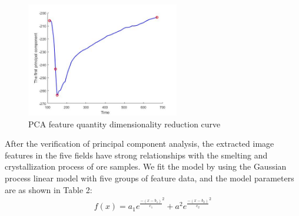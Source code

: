 \documentclass{apmcmthesis}
\begin{document}
		\begin{figure}[htbp!]
			\centering
			\includegraphics[height=5cm]{./figures/6-3-2.jpg}
			\caption{PCA feature quantity dimensionality reduction curve}
			\label{fig:9}
		\end{figure}
	
	

After the verification of principal component analysis, the extracted image features in the five fields have strong relationships with the smelting and crystallization process of ore samples. We fit the model by using the Gaussian process linear model with five groups of feature data, and the model parameters are as shown in Table 2:
	\begin{equation}
		\tag{6-3-1}
		\begin{split}
			f(x) = a_{1}e^{\frac{-(x-b_{1})}{c_{1}}^{2}}+a^{2}e^{\frac{-(x-b_{2})}{c_{2}}^{2}}
			\end{split}
	\end{equation}
\end{document}
